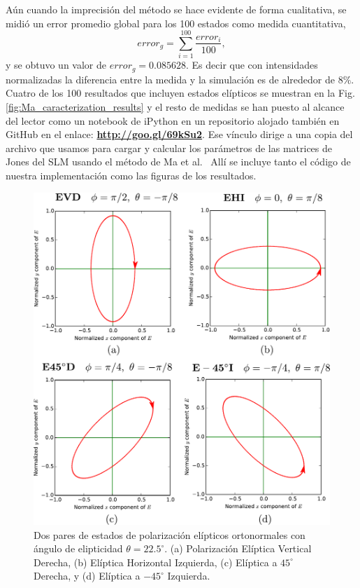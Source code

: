 Aún cuando la imprecisión del método se hace evidente de forma
cualitativa, se midió un error promedio global para los
100 estados como medida cuantitativa, $$error_g =
\sum_{i=1}^{100}\frac{error_i}{100},$$ y se obtuvo un valor de $error_g
= 0.085628$. Es decir que con intensidades normalizadas la diferencia
entre la medida y la simulación es de alrededor de $8\%$.
Cuatro de los 100 resultados que incluyen estados elípticos se muestran en la
Fig. \ref{fig:Ma_caracterization_results} y el resto de medidas se han
puesto al alcance del lector como un notebook de iPython en un
repositorio alojado también en GitHub en el enlace: \href{http://goo.gl/69kSu2}{\textbf{http://goo.gl/69kSu2}}. 
Ese vínculo dirige a una copia del archivo que
usamos para cargar y calcular los parámetros de las matrices de Jones
del SLM usando el método de Ma et al.~ Allí se incluye tanto el código
de nuestra implementación como las figuras de los resultados. 
\begin{figure}[h!]
\centering
\includegraphics[scale = .6]{EVD_EHI_E45D_Em45I.pdf}
\caption[Estados de polarización elípticos]{Dos pares de estados de polarización
  elípticos ortonormales con ángulo de elipticidad $\theta = 22.5^{\circ}$. (a) Polarización Elíptica Vertical Derecha,
  (b) Elíptica Horizontal Izquierda, (c) Elíptica a $45^{\circ}$
  Derecha, y (d) Elíptica a $-45^{\circ}$ Izquierda.}
\label{fig:elliptic_states}
\end{figure}
